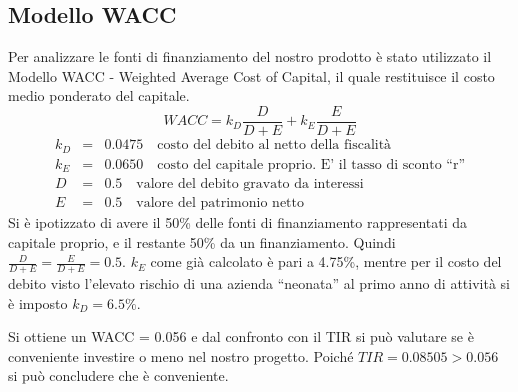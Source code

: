 \subsection{Modello WACC}
Per analizzare le fonti di finanziamento del nostro prodotto è stato utilizzato
il Modello WACC - Weighted Average Cost of Capital, il quale restituisce il
costo medio ponderato del capitale.
\begin{displaymath}
WACC = k_D \frac{D}{D+E} + k_E \frac{E}{D+E}
\end{displaymath}
\begin{eqnarray*}
k_D &=& 0.0475 \quad \mbox{costo del debito al netto della fiscalità} \\
k_E &=& 0.0650 \quad \mbox{costo del capitale proprio. E’ il tasso di sconto “r”} \\
D &=& 0.5 \quad \mbox{valore del debito gravato da interessi} \\
E &=& 0.5 \quad \mbox{valore del patrimonio netto} 
\end{eqnarray*}
Si è ipotizzato di avere il 50\% delle fonti di finanziamento rappresentati da
capitale proprio, e il restante 50\% da un finanziamento. Quindi $\frac{D}{D+E} 
= \frac{E}{D+E} = 0.5$.  $k_E$ come già calcolato è pari a 4.75\%, mentre per il
costo del debito visto l’elevato rischio di una azienda “neonata” al primo anno
di attività si è imposto $k_D = 6.5\%$. 

Si ottiene un WACC = 0.056 e dal confronto con il TIR si può valutare se è
conveniente investire o meno nel nostro progetto. Poiché $TIR = 0.08505 > 0.056$
si può concludere che è conveniente.
